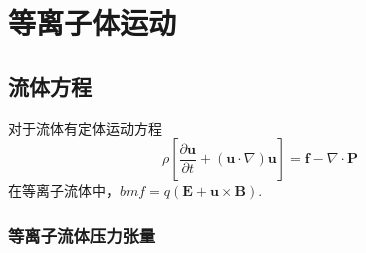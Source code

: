 \documentclass[UTF8]{article}
\numberwithin{equation}{subsubsection}
\begin{document}
\section{等离子体运动}
\subsection{流体方程}
\begin{flushleft}
 对于流体有定体运动方程
 \begin{equation}
  \rho[\frac{\partial\bm{u}}{\partial t}+(\bm{u}\cdot\nabla)\bm{u}]=\bm{f}-\nabla\cdot\bm{P}
 \end{equation}
 在等离子流体中，$bm{f}=q(\bm{E}+\bm{u}\times\bm{B})$.
\end{flushleft}
\subsubsection{等离子流体压力张量}
\end{document}
